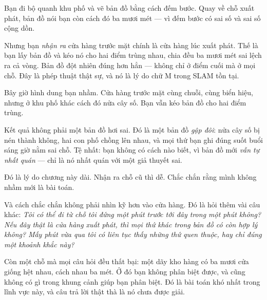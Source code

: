 \documentclass[../../vslam.tex]{subfiles}
\begin{document}
\begin{dongian}
Bạn đi bộ quanh khu phố và vẽ bản đồ bằng cách đếm bước. Quay về chỗ xuất phát, bản đồ nói bạn còn cách đó ba mươi mét --- vì đếm bước có sai số và sai số cộng dồn.

Nhưng bạn \emph{nhận ra} cửa hàng trước mặt chính là cửa hàng lúc xuất phát. Thế là bạn lấy bản đồ và kéo nó cho hai điểm trùng nhau, chia đều ba mươi mét sai lệch ra cả vòng. Bản đồ đột nhiên đúng hơn hẳn --- không chỉ ở điểm cuối mà ở mọi chỗ. Đây là phép thuật thật sự, và nó là lý do chữ M trong SLAM tồn tại.

Bây giờ hình dung bạn nhầm. Cửa hàng trước mặt cùng chuỗi, cùng biển hiệu, nhưng ở khu phố khác cách đó nửa cây số. Bạn vẫn kéo bản đồ cho hai điểm trùng.

Kết quả không phải một bản đồ hơi sai. Đó là một bản đồ \emph{gập đôi}: nửa cây số bị nén thành không, hai con phố chồng lên nhau, và mọi thứ bạn ghi đúng suốt buổi sáng giờ nằm sai chỗ. Tệ nhất: bạn không có cách nào biết, vì bản đồ mới \emph{vẫn tự nhất quán} --- chỉ là nó nhất quán với một giả thuyết sai.

Đó là lý do chương này dài. Nhận ra chỗ cũ thì dễ. Chắc chắn rằng mình không nhầm mới là bài toán.

Và cách chắc chắn không phải nhìn kỹ hơn vào cửa hàng. Đó là hỏi thêm vài câu khác: \emph{Tôi có thể đi từ chỗ tôi đứng một phút trước tới đây trong một phút không?} \emph{Nếu đây thật là cửa hàng xuất phát, thì mọi thứ khác trong bản đồ có còn hợp lý không?} \emph{Mấy phút vừa qua tôi có liên tục thấy những thứ quen thuộc, hay chỉ đúng một khoảnh khắc này?}

Còn một chỗ mà mọi câu hỏi đều thất bại: một dãy kho hàng có ba mươi cửa giống hệt nhau, cách nhau ba mét. Ở đó bạn không phân biệt được, và cũng không có gì trong khung cảnh giúp bạn phân biệt. Đó là bài toán khó nhất trong lĩnh vực này, và câu trả lời thật thà là nó chưa được giải.

\end{dongian}
\end{document}
